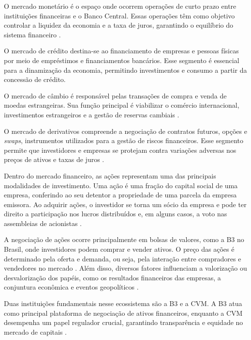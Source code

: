 \documentclass[recuosum=1.5cm]{iftex2024}
\begin{document}
O mercado monetário é o espaço onde ocorrem operações de curto prazo entre instituições financeiras e o Banco Central. Essas operações têm como objetivo controlar a liquidez da economia e a taxa de juros, garantindo o equilíbrio do sistema financeiro \cite{deSouzaFigueiredo:2021:mercado}.

O mercado de crédito destina-se ao financiamento de empresas e pessoas físicas por meio de empréstimos e financiamentos bancários. Esse segmento é essencial para a dinamização da economia, permitindo investimentos e consumo a partir da concessão de crédito.

O mercado de câmbio é responsável pelas transações de compra e venda de moedas estrangeiras. Sua função principal é viabilizar o comércio internacional, investimentos estrangeiros e a gestão de reservas cambiais \cite{gois:2019:efeito}.

O mercado de derivativos compreende a negociação de contratos futuros, opções e \textit{swaps}, instrumentos utilizados para a gestão de riscos financeiros. Esse segmento permite que investidores e empresas se protejam contra variações adversas nos preços de ativos e taxas de juros \cite{figueiredo:2023:capacidade}.

Dentro do mercado financeiro, as ações representam uma das principais modalidades de investimento. Uma ação é uma fração do capital social de uma empresa, conferindo ao seu detentor a propriedade de uma parcela da empresa emissora. Ao adquirir ações, o investidor se torna um sócio da empresa e pode ter direito a participação nos lucros distribuídos e, em alguns casos, a voto nas assembleias de acionistas \cite{reis:2021:negociacao, gomes:2007:bolsa}.

A negociação de ações ocorre principalmente em bolsas de valores, como a B3 no Brasil, onde investidores podem comprar e vender ativos. O preço das ações é determinado pela oferta e demanda, ou seja, pela interação entre compradores e vendedores no mercado \cite{santander:2024:pregao}. Além disso, diversos fatores influenciam a valorização ou desvalorização dos papéis, como os resultados financeiros das empresas, a conjuntura econômica e eventos geopolíticos \cite{damodaran:2012:investimentos, attie:2013:bolsa}.

Duas instituições fundamentais nesse ecossistema são a B3 e a CVM. A B3 atua como principal plataforma de negociação de ativos financeiros, enquanto a CVM desempenha um papel regulador crucial, garantindo transparência e equidade no mercado de capitais \cite{cvm:2023:funcoes}.
\end{document}
